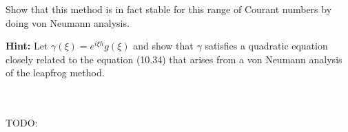 Show that this method is in fact stable for this range of Courant numbers by doing von Neumann analysis.

\textbf{Hint:} Let $\gamma(\xi) = e^{i \xi h} g(\xi)$ and show that $\gamma$ satisfies a quadratic equation closely
related to the equation (10.34) that arises from a von Neumann analysis of the leapfrog method.

\begin{solution}\ \\\\
    TODO:
    \hfill\vfill
    \ \\
\end{solution}